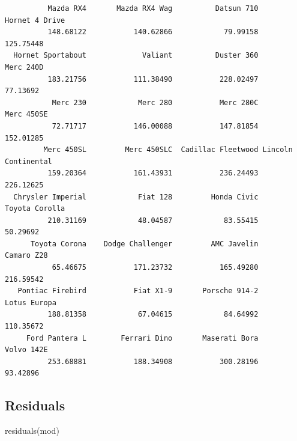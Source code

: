 \documentclass[
]{book}
\newenvironment{Shaded}{\begin{snugshade}}{\end{snugshade}}
\newcommand{\CommentTok}[1]{\textcolor[rgb]{0.56,0.35,0.01}{\textit{#1}}}
\newcommand{\FunctionTok}[1]{\textcolor[rgb]{0.00,0.00,0.00}{#1}}
\newcommand{\NormalTok}[1]{#1}
\newcommand{\SpecialCharTok}[1]{\textcolor[rgb]{0.00,0.00,0.00}{#1}}
\begin{document}
\begin{Shaded}
\end{Shaded}

\begin{verbatim}
          Mazda RX4       Mazda RX4 Wag          Datsun 710      Hornet 4 Drive 
          148.68122           140.62866            79.99158           125.75448 
  Hornet Sportabout             Valiant          Duster 360           Merc 240D 
          183.21756           111.38490           228.02497            77.13692 
           Merc 230            Merc 280           Merc 280C          Merc 450SE 
           72.71717           146.00088           147.81854           152.01285 
         Merc 450SL         Merc 450SLC  Cadillac Fleetwood Lincoln Continental 
          159.20364           161.43931           236.24493           226.12625 
  Chrysler Imperial            Fiat 128         Honda Civic      Toyota Corolla 
          210.31169            48.04587            83.55415            50.29692 
      Toyota Corona    Dodge Challenger         AMC Javelin          Camaro Z28 
           65.46675           171.23732           165.49280           216.59542 
   Pontiac Firebird           Fiat X1-9       Porsche 914-2        Lotus Europa 
          188.81358            67.04615            84.64992           110.35672 
     Ford Pantera L        Ferrari Dino       Maserati Bora          Volvo 142E 
          253.68881           188.34908           300.28196            93.42896 
\end{verbatim}

\hypertarget{residuals}{%
\subsection{Residuals}\label{residuals}}

\begin{Shaded}
\begin{Highlighting}[]
\FunctionTok{residuals}\NormalTok{(mod)}
\end{Highlighting}
\end{Shaded}
\end{document}
